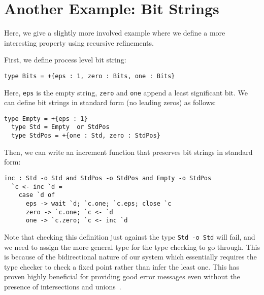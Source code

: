
\chapter{Another Example: Bit Strings}
\label{example:bitstrings}

Here, we give a slightly more involved example where we define a more interesting property using recursive refinements.

First, we define process level bit string:
\begin{lstlisting}[language=krill, style=custom]
  type Bits = +{eps : 1, zero : Bits, one : Bits}
\end{lstlisting}
Here, \texttt{eps} is the empty string, \texttt{zero} and \texttt{one} append a least significant bit. We can define bit strings in standard form (no leading zeros) as follows:
\begin{lstlisting}[language=krill, style=custom]
  type Empty = +{eps : 1}
  type Std = Empty  or StdPos
  type StdPos = +{one : Std, zero : StdPos}
\end{lstlisting}

Then, we can write an increment function that preserves bit strings in standard form:
\begin{lstlisting}[language=krill, style=custom]
  inc : Std -o Std and StdPos -o StdPos and Empty -o StdPos
  `c <- inc `d =
    case `d of
      eps -> wait `d; `c.one; `c.eps; close `c
      zero -> `c.one; `c <- `d
      one -> `c.zero; `c <- inc `d
\end{lstlisting}

Note that checking this definition just against the type \texttt{Std -o Std} will fail, and we need to assign the more general type for the type checking to go through.  This is because of the bidirectional nature of our system which essentially requires the type checker to check a fixed point rather than infer the least one. This has proven highly beneficial for providing good error messages even without the presence of intersections and unions~\cite{Griffith16phd}.

